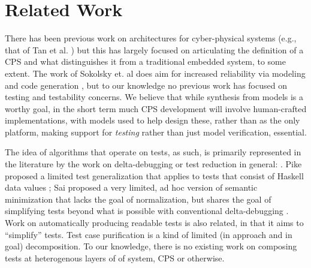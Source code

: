 \section{Related Work}

There has been previous work on architectures for cyber-physical systems (e.g., that of Tan et al. \cite{tan2008prototype}) but this has largely focused on articulating the definition of a CPS and what distinguishes it from a traditional embedded system, to some extent.  The work of Sokolsky et. al does aim for increased reliability via modeling and code generation \cite{sokolsky2014architecture}, but to our knowledge no previous work has focused on testing and testability concerns.  We believe that while synthesis from models is a worthy goal, in the short term much CPS development will involve human-crafted implementations, with models used to help design these, rather than as the only platform, making support for \emph{testing} rather than just model verification, essential.

The idea of algorithms that operate on tests, as such, is
primarily represented in the literature by the work on
delta-debugging or test reduction in general:
\cite{DD,HDD,TCminim,MinUnit,CReduce,Lithium,ZellerBook,DDISSTA,IsolThread,Yesterday}.  Pike proposed a limited test
generalization that applies to tests that consist of Haskell data
values \cite{SmartCheck}; Sai proposed a very limited, ad hoc
version of semantic minimization that lacks the goal of normalization,
but shares the goal of simplifying tests beyond what is possible with
conventional delta-debugging \cite{SaiSimple}.  Work on automatically producing readable tests \cite{Guava,Readable} is also
related, in that it aims to ``simplify'' tests.  Test case
purification \cite{PureTest} is a kind of limited (in approach and in
goal) decomposition.  To our knowledge, there is no existing work on composing tests at heterogenous layers of of system, CPS or otherwise.